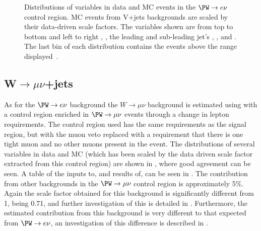 \begin{figure}
  \caption{Distributions of variables in data and \ac{MC} events in the $\PW\rightarrow e\nu$ control region. \ac{MC} events from V+jets backgrounds are scaled by their data-driven scale factors. The variables shown are from top to bottom and left to right \detajj, \Mjj, the leading and sub-leading jet's \pt, \METnoMU, \METsig and \jetmetdphi. The last bin of each distribution contains the events above the range displayed~\cite{CMS-PAS-HIG-14-038}.}
  \label{fig:parkedwenu}
\end{figure}

\subsection{W$\rightarrow \mu\nu$+jets}
\label{sec:parkedwmunu}
As for the $\PW\rightarrow e\nu$ background the $W\rightarrow \mu\nu$ background is estimated using  with a control region enriched in $\PW\rightarrow\mu\nu$ events through a change in lepton requirements. The control region used has the same requirements as the signal region, but with the muon veto replaced with a requirement that there is one tight muon and no other muons present in the event. The distributions of several variables in data and \ac{MC} (which has been scaled by the data driven scale factor extracted from this control region) are shown in , where good agreement can be seen. A table of the inputs to, and results of,  can be seen in . The contribution from other backgrounds in the $\PW\rightarrow\mu\nu$ control region is approximately 5\%. Again the scale factor obtained  for this background is significantly different from 1, being 0.71, and further investigation of this is detailed in . Furthermore, the estimated contribution from this background is very different to that expected from $\PW\rightarrow e\nu$, an investigation of this difference is described in .


